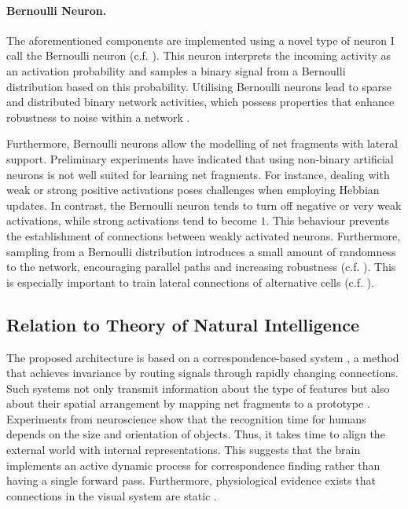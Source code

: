 \paragraph{Bernoulli Neuron.} The aforementioned components are implemented using a novel type of neuron I call the Bernoulli neuron (c.f. ). This neuron interprets the incoming activity as an activation probability and samples a binary signal from a Bernoulli distribution based on this probability. Utilising Bernoulli neurons lead to sparse and distributed binary network activities, which possess properties that enhance robustness to noise within a network .

Furthermore, Bernoulli neurons allow the modelling of net fragments with lateral support. Preliminary experiments have indicated that using non-binary artificial neurons is not well suited for learning net fragments. For instance, dealing with weak or strong positive activations poses challenges when employing Hebbian updates. In contrast, the Bernoulli neuron tends to turn off negative or very weak activations, while strong activations tend to become $1$. This behaviour prevents the establishment of connections between weakly activated neurons. Furthermore, sampling from a Bernoulli distribution introduces a small amount of randomness to the network, encouraging parallel paths and increasing robustness (c.f. ). This is especially important to train lateral connections of alternative cells (c.f. ).


\subsection{Relation to Theory of Natural Intelligence}
The proposed architecture is based on a correspondence-based system , a method that achieves invariance by routing signals through rapidly changing connections. Such systems not only transmit information about the type of features but also about their spatial arrangement by mapping net fragments to a prototype .
Experiments from neuroscience show that the recognition time for humans depends on the size  and orientation  of objects. Thus, it takes time to align the external world with internal representations.
This suggests that the brain implements an active dynamic process for correspondence finding rather than having a single forward pass.
Furthermore, physiological evidence exists that connections in the visual system are static \cite{kusunoki_time_2003, womelsdorf_dynamic_2006}.

